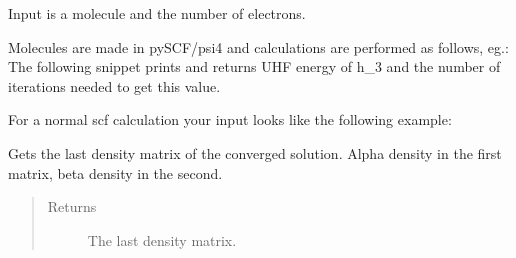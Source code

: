 \documentclass[letterpaper,10pt,english]{sphinxmanual}
\begin{document}
\begin{fulllineitems}
\label{\detokenize{cUHF_s:hf.cUHF_s.CUHF}}
Input is a molecule and the number of electrons.

Molecules are made in pySCF/psi4 and calculations are performed as follows, eg.:
The following snippet prints and returns UHF energy of h\_3
and the number of iterations needed to get this value.

For a normal scf calculation your input looks like the following example:

\begin{sphinxVerbatim}[commandchars=\\\{\}]
          
   
\end{sphinxVerbatim}

\begin{fulllineitems}
\label{\detokenize{cUHF_s:hf.cUHF_s.CUHF.get_dens}}
Gets the last density matrix of the converged solution.
Alpha density in the first matrix, beta density in the second.
\begin{quote}\begin{description}
\item[{Returns}] \leavevmode
The last density matrix.

\end{description}\end{quote}

\end{fulllineitems}



\end{fulllineitems}
\end{document}
